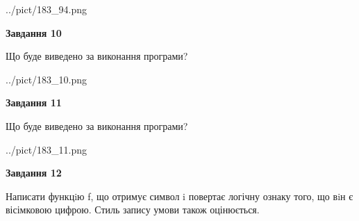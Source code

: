 \documentclass[12pt, ukrainian]{article}
\begin{document}
{\begin {large}
\begin{center}
	{../pict/183_94.png}
\end{center}
\newpage

{\begin {center}\textbf{Завдання 10}\end {center}}

Що буде виведено за виконання програми?\par
\begin{center}
	{../pict/183_10.png}
\end{center}
\newpage

{\begin {center}\textbf{Завдання 11}\end {center}}

Що буде виведено за виконання програми?\par
\begin{center}
	{../pict/183_11.png}
\end{center}
\newpage

{\begin {center}\textbf{Завдання 12}\end {center}}


Написати функцiю f, що отримує символ i повертає логічну ознаку того, що вiн є вісімковою цифрою. Стиль запису умови також оцінюється.\par
\newpage

\end {large}}
\end{document}
